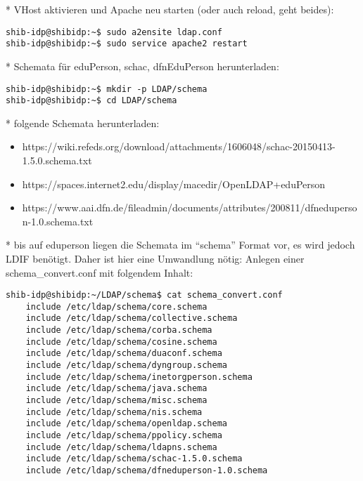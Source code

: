 * VHost aktivieren und Apache neu starten (oder auch reload, geht beides):
\begin{lstlisting}
shib-idp@shibidp:~$ sudo a2ensite ldap.conf
shib-idp@shibidp:~$ sudo service apache2 restart
\end{lstlisting}

* Schemata für eduPerson, schac, dfnEduPerson herunterladen:
\begin{lstlisting}
shib-idp@shibidp:~$ mkdir -p LDAP/schema
shib-idp@shibidp:~$ cd LDAP/schema
\end{lstlisting}
* folgende Schemata herunterladen:
\begin{itemize}
  \item
  https://wiki.refeds.org/download/attachments/1606048/schac-20150413-1.5.0.schema.txt
  \item https://spaces.internet2.edu/display/macedir/OpenLDAP+eduPerson
  \item
  https://www.aai.dfn.de/fileadmin/documents/attributes/200811/dfneduperson-1.0.schema.txt
\end{itemize}

* bis auf eduperson liegen die Schemata im "`schema"' Format vor, es wird jedoch LDIF benötigt. Daher ist hier eine Umwandlung nötig:
\newline * Anlegen einer schema\_convert.conf mit folgendem Inhalt:
\begin{lstlisting}
shib-idp@shibidp:~/LDAP/schema$ cat schema_convert.conf
	include /etc/ldap/schema/core.schema
	include /etc/ldap/schema/collective.schema
	include /etc/ldap/schema/corba.schema
	include /etc/ldap/schema/cosine.schema
	include /etc/ldap/schema/duaconf.schema
	include /etc/ldap/schema/dyngroup.schema
	include /etc/ldap/schema/inetorgperson.schema
	include /etc/ldap/schema/java.schema
	include /etc/ldap/schema/misc.schema
	include /etc/ldap/schema/nis.schema
	include /etc/ldap/schema/openldap.schema
	include /etc/ldap/schema/ppolicy.schema
	include /etc/ldap/schema/ldapns.schema
	include /etc/ldap/schema/schac-1.5.0.schema
	include /etc/ldap/schema/dfneduperson-1.0.schema
\end{lstlisting}


